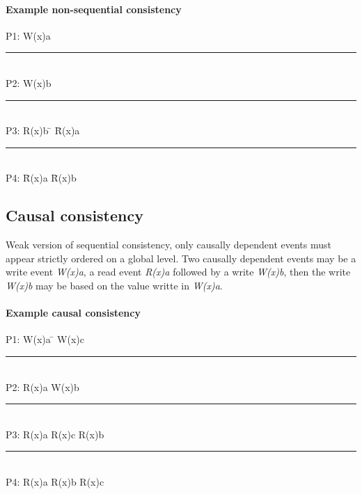 \paragraph{Example non-sequential consistency}
\begin{tabbing}
P1: W(x)a \= \\
\rule{0.4\textwidth}{0.4pt} \\
P2: \> W(x)b \= \\
\rule{0.4\textwidth}{0.4pt} \\
P3: \> \> R(x)b \= \hspace{32pt} \= R(x)a \\
\rule{0.4\textwidth}{0.4pt} \\
P4: \> \> \> \= R(x)a \hspace{5pt} \= R(x)b \\
\end{tabbing}

\subsection{Causal consistency}
Weak version of sequential consistency, only causally dependent events must appear strictly ordered on a global level.
Two causally dependent events may be a write event \emph{W(x)a}, a read event \emph{R(x)a} followed by a write \emph{W(x)b}, then the write \emph{W(x)b} may be based on the value writte in \emph{W(x)a}.
\paragraph{Example causal consistency}
\begin{tabbing}
P1: W(x)a \= \hspace{64pt} W(x)c \= \\
\rule{0.5\textwidth}{0.4pt} \\
P2: \> R(x)a \hspace{5pt} W(x)b \\
\rule{0.5\textwidth}{0.4pt} \\
P3: \> R(x)a \> R(x)c \hspace{5pt} R(x)b \\
\rule{0.5\textwidth}{0.4pt} \\
P4: \> R(x)a \> R(x)b \hspace{5pt} R(x)c \\
\end{tabbing}
